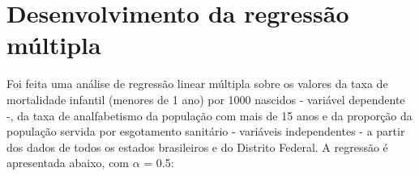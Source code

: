 \chapter{Desenvolvimento da regressão múltipla}
\label{ref:desenvolvimento}
Foi feita uma análise de regressão linear múltipla sobre os valores da taxa de mortalidade infantil (menores de 1 ano) por 1000 nascidos - variável dependente -, da taxa de analfabetismo da população com mais de 15 anos e da proporção da população servida por esgotamento sanitário - variáveis independentes - a partir dos dados de todos os estados brasileiros e do Distrito Federal. A regressão é apresentada abaixo, com $\alpha$ = 0.5:

